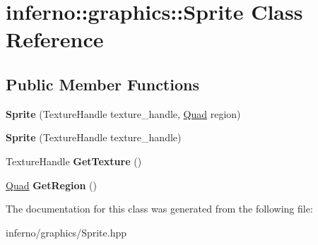 \hypertarget{classinferno_1_1graphics_1_1_sprite}{}\section{inferno\+:\+:graphics\+:\+:Sprite Class Reference}
\label{classinferno_1_1graphics_1_1_sprite}
\subsection*{Public Member Functions}
\begin{DoxyCompactItemize}
\item 
\mbox{\label{classinferno_1_1graphics_1_1_sprite_a404b45a087a04018e5e2bc5c7b59ab67}} 
{\bfseries Sprite} (Texture\+Handle texture\+\_\+handle, \mbox{\hyperlink{classinferno_1_1graphics_1_1_rectangle}{Quad}} region)
\item 
\mbox{\label{classinferno_1_1graphics_1_1_sprite_a8673ad1ca45d867e83355a1ad10b752a}} 
{\bfseries Sprite} (Texture\+Handle texture\+\_\+handle)
\item 
\mbox{\label{classinferno_1_1graphics_1_1_sprite_a289d0e72752f3606116c75442a710e61}} 
Texture\+Handle {\bfseries Get\+Texture} ()
\item 
\mbox{\label{classinferno_1_1graphics_1_1_sprite_ad2f468c9390d0d952f049daba69ef53f}} 
\mbox{\hyperlink{classinferno_1_1graphics_1_1_rectangle}{Quad}} {\bfseries Get\+Region} ()
\end{DoxyCompactItemize}


The documentation for this class was generated from the following file\+:\begin{DoxyCompactItemize}
\item 
inferno/graphics/Sprite.\+hpp\end{DoxyCompactItemize}
